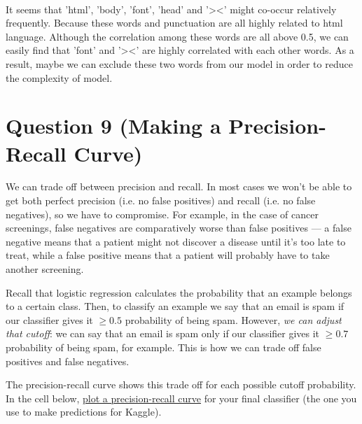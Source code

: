 \documentclass[11pt]{article}
\begin{document}
    \begin{center}
    \end{center}
    { \hspace*{\fill} \\}
    
    It seems that 'html', 'body', 'font', 'head' and
'\textgreater{}\textless{}' might co-occur relatively frequently.
Because these words and punctuation are all highly related to html
language. Although the correlation among these words are all above 0.5,
we can easily find that 'font' and '\textgreater{}\textless{}' are
highly correlated with each other words. As a result, maybe we can
exclude these two words from our model in order to reduce the complexity
of model.

    \section{Question 9 (Making a Precision-Recall
Curve)}\label{question-9-making-a-precision-recall-curve}

We can trade off between precision and recall. In most cases we won't be
able to get both perfect precision (i.e. no false positives) and recall
(i.e. no false negatives), so we have to compromise. For example, in the
case of cancer screenings, false negatives are comparatively worse than
false positives --- a false negative means that a patient might not
discover a disease until it's too late to treat, while a false positive
means that a patient will probably have to take another screening.

Recall that logistic regression calculates the probability that an
example belongs to a certain class. Then, to classify an example we say
that an email is spam if our classifier gives it \(\ge 0.5\) probability
of being spam. However, \emph{we can adjust that cutoff}: we can say
that an email is spam only if our classifier gives it \(\ge 0.7\)
probability of being spam, for example. This is how we can trade off
false positives and false negatives.

The precision-recall curve shows this trade off for each possible cutoff
probability. In the cell below,
\href{http://scikit-learn.org/stable/auto_examples/model_selection/plot_precision_recall.html\#plot-the-precision-recall-curve}{plot
a precision-recall curve} for your final classifier (the one you use to
make predictions for Kaggle).
\end{document}
